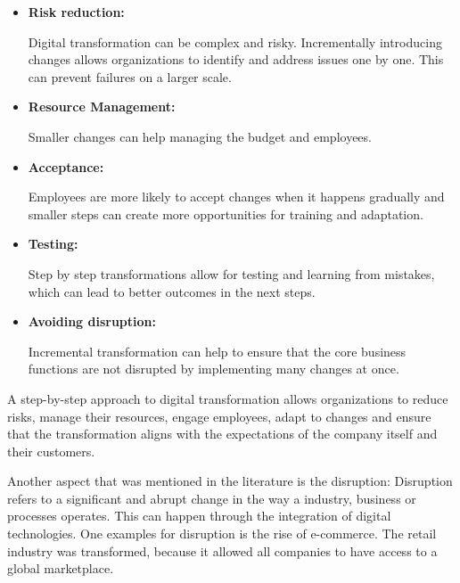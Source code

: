 \documentclass[a4]{scrartcl}
\begin{document}
\begin{itemize}
	
	
	\item \textbf{Risk reduction:}
	
	Digital transformation can be complex and risky. Incrementally introducing changes allows organizations to identify and address issues one by one. This can prevent failures on a larger scale. \cite{5myths}
	
	
	\item \textbf{Resource Management:}
	
	Smaller changes can help managing the budget and employees. \cite{5myths, disruptive, venkat}
	
	
	\item \textbf{Acceptance:} 
	
	Employees are more likely to accept changes when it happens gradually and smaller steps can create more opportunities for training and adaptation. \cite{acceptance, wiwi}
	
	
	\item  \textbf{Testing:} 
	
	Step by step transformations allow for testing and learning from mistakes, which can lead to better outcomes in the next steps. \cite{venkat}
	
	
	
	\item  \textbf{Avoiding disruption:}
	
	Incremental transformation can help to ensure that the core business functions are not disrupted by implementing many changes at once. \cite{5myths, disruptive, venkat}
	
	
	
\end{itemize}


A step-by-step approach to digital transformation allows organizations to reduce risks, manage their resources, engage employees, adapt to changes and ensure that the transformation aligns with the expectations of the company itself and their customers.


Another aspect that was mentioned in the literature is the disruption: 
Disruption refers to a significant and abrupt change in the way a industry, business or processes operates. This can happen through the integration of digital technologies. 
One examples for disruption is the rise of e-commerce. The retail industry was transformed, because it allowed all companies to have access to a global marketplace. \cite{digitalmatrix, vial, DTOT, leadingdigital}
\end{document}
